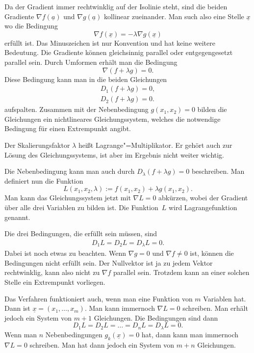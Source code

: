 \documentclass[a4paper,10pt,fleqn,twocolumn,twoside]{article}
\begin{document}
Da der Gradient immer rechtwinklig auf der Isolinie steht, sind die
beiden Gradiente \(\nabla f(\underline a)\) und
\(\nabla g(\underline a)\) kollinear zueinander. Man such also eine
Stelle \(\underline x\) wo die Bedingung
\[\nabla f(\underline x) = -\lambda\nabla g(\underline x)\]
erfüllt ist. Das Minuszeichen ist nur Konvention und hat keine weitere
Bedeutung. Die Gradiente können
gleichsinnig parallel oder entgegengesetzt parallel sein.
Durch Umformen erhält man die Bedingung
\[\nabla (f+\lambda g)=0.\]
Diese Bedingung kann man in die beiden Gleichungen
\begin{gather*}
D_1(f+\lambda g)=0,\\
D_2(f+\lambda g)=0.
\end{gather*}
aufspalten. Zusammen mit der Nebenbedingung \(g(x_1,x_2)=0\) bilden
die Gleichungen ein nichtlineares Gleichungssystem, welches die
notwendige Bedingung für einen Extrempunkt angibt.

Der Skalierungsfaktor \(\lambda\) heißt Lagrange"=Multiplikator.
Er gehört auch zur Lösung des Gleichungssystems, ist aber
im Ergebnis nicht weiter wichtig.

Die Nebenbedingung kann man auch durch
\(D_\lambda (f+\lambda g)=0\) beschreiben.
Man definiert nun die Funktion
\[L(x_1,x_2,\lambda) := f(x_1,x_2)+\lambda g(x_1,x_2).\]
Man kann das Gleichungssystem jetzt mit \(\nabla L=0\)
abkürzen, wobei der Gradient über alle drei Variablen zu bilden ist.
Die Funktion~\(L\) wird Lagrangefunktion genannt.

Die drei Bedingungen, die erfüllt sein müssen, sind
\begin{gather*}
D_1 L = D_2 L = D_\lambda L = 0.
\end{gather*}
Dabei ist noch etwas zu beachten. Wenn \(\nabla g=0\) und
\(\nabla f\ne 0\) ist, können die Bedingungen
nicht erfüllt sein. Der Nullvektor ist ja zu jedem Vektor
rechtwinklig, kann also nicht zu \(\nabla f\) parallel sein.
Trotzdem kann an einer solchen Stelle ein Extrempunkt vorliegen.

Das Verfahren funktioniert auch, wenn man eine Funktion von \(m\)
Variablen hat. Dann ist \(\underline x=(x_1,\ldots,x_m).\)
Man kann immernoch \(\nabla L=0\) schreiben. Man erhält jedoch ein
System von \(m+1\) Gleichungen. Die Bedingungen sind dann
\[D_1 L = D_2 L = \ldots = D_n L = D_\lambda L = 0.\]
%
Wenn man \(n\) Nebenbedingungen \(g_k(\underline x)=0\) hat,
dann kann man immernoch \(\nabla L=0\) schreiben.
Man hat dann jedoch ein System von \(m+n\) Gleichungen.
\end{document}
